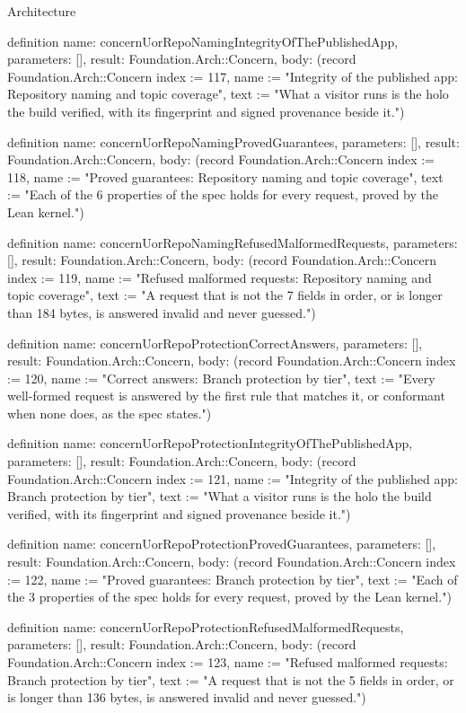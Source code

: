 \begin{lexlean}{Architecture}
\begin{semanticmodule}
definition{
  name: concernUorRepoNamingIntegrityOfThePublishedApp,
  parameters: [],
  result: Foundation.Arch::Concern,
  body: (record Foundation.Arch::Concern {index := 117, name := "Integrity of the published app: Repository naming and topic coverage", text := "What a visitor runs is the holo the build verified, with its fingerprint and signed provenance beside it."})
}

definition{
  name: concernUorRepoNamingProvedGuarantees,
  parameters: [],
  result: Foundation.Arch::Concern,
  body: (record Foundation.Arch::Concern {index := 118, name := "Proved guarantees: Repository naming and topic coverage", text := "Each of the 6 properties of the spec holds for every request, proved by the Lean kernel."})
}

definition{
  name: concernUorRepoNamingRefusedMalformedRequests,
  parameters: [],
  result: Foundation.Arch::Concern,
  body: (record Foundation.Arch::Concern {index := 119, name := "Refused malformed requests: Repository naming and topic coverage", text := "A request that is not the 7 fields in order, or is longer than 184 bytes, is answered invalid and never guessed."})
}

definition{
  name: concernUorRepoProtectionCorrectAnswers,
  parameters: [],
  result: Foundation.Arch::Concern,
  body: (record Foundation.Arch::Concern {index := 120, name := "Correct answers: Branch protection by tier", text := "Every well-formed request is answered by the first rule that matches it, or conformant when none does, as the spec states."})
}

definition{
  name: concernUorRepoProtectionIntegrityOfThePublishedApp,
  parameters: [],
  result: Foundation.Arch::Concern,
  body: (record Foundation.Arch::Concern {index := 121, name := "Integrity of the published app: Branch protection by tier", text := "What a visitor runs is the holo the build verified, with its fingerprint and signed provenance beside it."})
}

definition{
  name: concernUorRepoProtectionProvedGuarantees,
  parameters: [],
  result: Foundation.Arch::Concern,
  body: (record Foundation.Arch::Concern {index := 122, name := "Proved guarantees: Branch protection by tier", text := "Each of the 3 properties of the spec holds for every request, proved by the Lean kernel."})
}

definition{
  name: concernUorRepoProtectionRefusedMalformedRequests,
  parameters: [],
  result: Foundation.Arch::Concern,
  body: (record Foundation.Arch::Concern {index := 123, name := "Refused malformed requests: Branch protection by tier", text := "A request that is not the 5 fields in order, or is longer than 136 bytes, is answered invalid and never guessed."})
}


\end{semanticmodule}
\end{lexlean}
